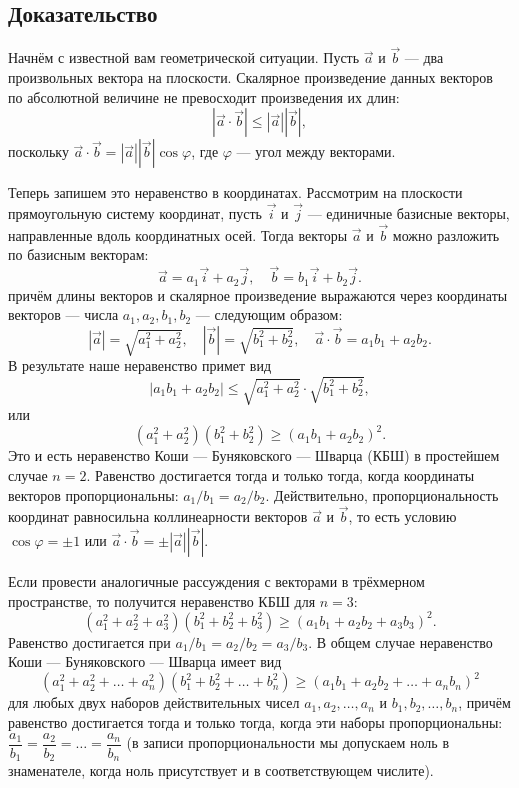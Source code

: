 \documentclass[12pt]{article}
\begin{document}
\subsection*{Доказательство}
Начнём с известной вам геометрической ситуации. Пусть $\vec{a}$ и $\vec{b}$ — два произвольных вектора на плоскости. Скалярное произведение данных векторов по абсолютной величине не превосходит произведения их длин:
$$
|\vec{a} \cdot \vec{b}| \leq |\vec{a}| |\vec{b}|,
$$
поскольку $\vec{a} \cdot \vec{b} = |\vec{a}| |\vec{b}| \cos \varphi$, где $\varphi$ — угол между векторами.

Теперь запишем это неравенство в координатах. Рассмотрим на плоскости прямоугольную систему координат, пусть $\vec{i}$ и $\vec{j}$ — единичные базисные векторы, направленные вдоль координатных осей. Тогда векторы $\vec{a}$ и $\vec{b}$ можно разложить по базисным векторам:
$$
\vec{a} = a_1 \vec{i} + a_2 \vec{j}, \quad \vec{b} = b_1 \vec{i} + b_2 \vec{j}.
$$
причём длины векторов и скалярное произведение выражаются через координаты векторов — числа $a_1, a_2, b_1, b_2$ — следующим образом:
$$
|\vec{a}| = \sqrt{a_1^2 + a_2^2}, \quad |\vec{b}| = \sqrt{b_1^2 + b_2^2}, \quad \vec{a} \cdot \vec{b} = a_1 b_1 + a_2 b_2.
$$
В результате наше неравенство примет вид
$$
|a_1 b_1 + a_2 b_2| \leq \sqrt{a_1^2 + a_2^2} \cdot \sqrt{b_1^2 + b_2^2},
$$
или
$$
(a_1^2 + a_2^2)(b_1^2 + b_2^2) \geq (a_1 b_1 + a_2 b_2)^2.
$$
Это и есть неравенство Коши — Буняковского — Шварца (КБШ) в простейшем случае $n = 2$. Равенство достигается тогда и только тогда, когда координаты векторов пропорциональны: $a_1/b_1 = a_2/b_2$. Действительно, пропорциональность координат равносильна коллинеарности векторов $\vec{a}$ и $\vec{b}$, то есть условию $\cos \varphi = \pm 1$ или $\vec{a} \cdot \vec{b} = \pm |\vec{a}| |\vec{b}|$.

Если провести аналогичные рассуждения с векторами в трёхмерном пространстве, то получится неравенство КБШ для $n = 3$:
$$
(a_1^2 + a_2^2 + a_3^2)(b_1^2 + b_2^2 + b_3^2) \geq (a_1 b_1 + a_2 b_2 + a_3 b_3)^2.
$$
Равенство достигается при $a_1/b_1 = a_2/b_2 = a_3/b_3$.
В общем случае неравенство Коши — Буняковского — Шварца имеет вид
$$
(a_1^2 + a_2^2 + \dots + a_n^2)(b_1^2 + b_2^2 + \dots + b_n^2) \geq (a_1 b_1 + a_2 b_2 + \dots + a_n b_n)^2
$$
для любых двух наборов действительных чисел $a_1, a_2, \dots, a_n$ и $b_1, b_2, \dots, b_n$, причём равенство достигается тогда и только тогда, когда эти наборы пропорциональны: $\dfrac{a_1}{b_1} = \dfrac{a_2}{b_2} = \dots = \dfrac{a_n}{b_n}$ (в записи пропорциональности мы допускаем ноль в знаменателе, когда ноль присутствует и в соответствующем числите).
\end{document}
